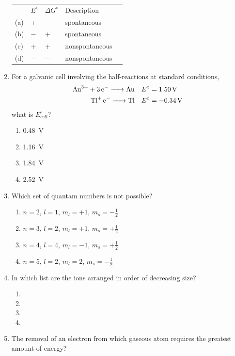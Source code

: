 \documentclass[11pt, leqno]{article}
\newcommand{\standard}{^\circ}
\begin{document}
\begin{enumerate}[leftmargin = *]
{
\renewcommand{\arraystretch}{1.5}
\begin{tabular}{lllll}
  & $E\standard$ & $\Delta{G\standard}$ & Description &  \\
(a) &  +  &  $-$  &       spontaneous        &  \\
(b) &  $-$  &  +  &       spontaneous        &  \\
(c) &  +  &  +  &       nonspontaneous     &  \\
(d) &  $-$ &  $-$  &       nonspontaneous
\end{tabular}
}
\item For a galvanic cell involving the half-reactions at standard conditions,
\begin{align*}
    \ce{Au^3+ + 3e- -> Au} && &E\standard = \SI{1.50}{\volt} \\
    \ce{Tl+ e- -> Tl} && &E\standard = \SI{-0.34}{\volt}
\end{align*}
what is $E\standard_{cell}$?
\begin{enumerate}
    \item \SI{0.48}{\volt}
    \item \SI{1.16}{\volt}
    \item \SI{1.84}{\volt}
    \item \SI{2.52}{\volt} 
\end{enumerate}
\item Which set of quantam numbers is not possible?
\begin{enumerate}
    \item $n = 2$, $l = 1$, $m_l = +1$, $m_s = -\frac{1}{2}$
    \item $n = 3$, $l = 2$, $m_l = +1$, $m_s = +\frac{1}{2}$
    \item $n = 4$, $l = 4$, $m_l = -1$, $m_s = +\frac{1}{2}$
    \item $n = 5$, $l = 2$, $m_l = 2$, $m_s = -\frac{1}{2}$
\end{enumerate}
\item In which list are the ions arranged in order of decreasing
size?
\begin{enumerate}
    \item {}
    \item {}
    \item {}
    \item {}
\end{enumerate}
\item The removal of an electron from which gaseous atom requires the greatest amount of energy?

\end{enumerate}
\end{document}
